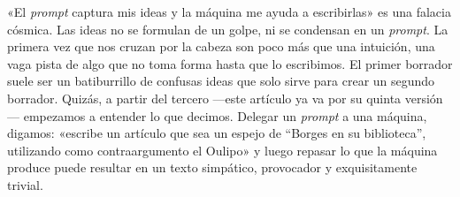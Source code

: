 \documentclass[11pt,a4paper]{article}
\begin{document}


«El \emph{prompt} captura mis ideas y la máquina me ayuda a escribirlas» es una falacia cósmica. Las ideas no se formulan de un golpe, ni se condensan en un \emph{prompt}. La primera vez que nos cruzan por la cabeza son poco más que una intuición, una vaga pista de algo que no toma forma hasta que lo escribimos. El primer borrador suele ser un batiburrillo de confusas ideas que solo sirve para crear un segundo borrador. Quizás, a partir del tercero ---este artículo ya va por su quinta versión--- empezamos a entender lo que decimos. Delegar un \emph{prompt} a una máquina, digamos: «escribe un artículo que sea un espejo de “Borges en su biblioteca”, utilizando como contraargumento el Oulipo» y luego repasar lo que la máquina produce puede resultar en un texto simpático, provocador y exquisitamente trivial. 
\end{document}

